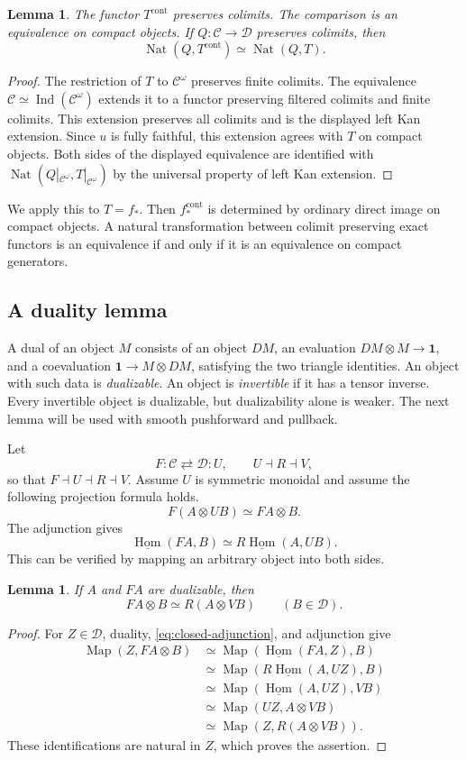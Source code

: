 \documentclass[11pt,reqno]{amsart}
\newtheorem{lemma}[theorem]{Lemma}
\theoremstyle{definition}
\theoremstyle{remark}
\theoremstyle{plain}
\numberwithin{equation}{section}
\newcommand{\one}{\mathbf 1}
\newcommand{\Hom}{\underline{\operatorname{Hom}}}
\DeclareMathOperator{\Map}{Map}
\DeclareMathOperator{\Nat}{Nat}
\DeclareMathOperator{\Ind}{Ind}
\newcommand{\cont}{\mathrm{cont}}
\newcommand{\C}{\mathcal C}
\newcommand{\D}{\mathcal D}
\begin{document}
\begin{lemma}\label{lem:continuous}
The functor \(T^{\cont}\) preserves colimits.
The comparison is an equivalence on compact objects.
If \(Q:\C\to\D\) preserves colimits, then
\[
 \Nat(Q,T^{\cont})\simeq\Nat(Q,T).
\]
\end{lemma}
\begin{proof}
The restriction of \(T\) to \(\C^\omega\) preserves finite colimits.
The equivalence \(\C\simeq\Ind(\C^\omega)\) extends it to a functor preserving filtered colimits and finite colimits.
This extension preserves all colimits and is the displayed left Kan extension.
Since \(u\) is fully faithful, this extension agrees with \(T\) on compact objects.
Both sides of the displayed equivalence are identified with
\(\Nat(Q|_{\C^\omega},T|_{\C^\omega})\) by the universal property of left Kan extension.
\end{proof}

We apply this to \(T=f_*\).
Then \(f_*^{\cont}\) is determined by ordinary direct image on compact objects.
A natural transformation between colimit preserving exact functors is an equivalence
if and only if it is an equivalence on compact generators.

\subsection{A duality lemma}
A dual of an object \(M\) consists of an object \(DM\), an evaluation
\(DM\otimes M\to\one\), and a coevaluation
\(\one\to M\otimes DM\), satisfying the two triangle identities.
An object with such data is \emph{dualizable}.
An object is \emph{invertible} if it has a tensor inverse.
Every invertible object is dualizable, but dualizability alone is weaker.
The next lemma will be used with smooth pushforward and pullback.

Let
\[
 F:\C\rightleftarrows\D:U,\qquad U\dashv R\dashv V,
\]
so that \(F\dashv U\dashv R\dashv V\).
Assume \(U\) is symmetric monoidal and assume the following projection formula holds.
\[
 F(A\otimes UB)\simeq FA\otimes B.
\]
The adjunction gives
\begin{equation}\label{eq:closed-adjunction}
 \Hom(FA,B)\simeq R\Hom(A,UB).
\end{equation}
This can be verified by mapping an arbitrary object into both sides.

\begin{lemma}\label{lem:abstract-duality}
If \(A\) and \(FA\) are dualizable, then
\[
 FA\otimes B\simeq R(A\otimes VB)
 \qquad(B\in\D).
\]
\end{lemma}
\begin{proof}
For \(Z\in\D\), duality, \eqref{eq:closed-adjunction}, and adjunction give
\begin{align*}
 \Map(Z,FA\otimes B)
 &\simeq\Map(\Hom(FA,Z),B)\\
 &\simeq\Map(R\Hom(A,UZ),B)\\
 &\simeq\Map(\Hom(A,UZ),VB)\\
 &\simeq\Map(UZ,A\otimes VB)\\
 &\simeq\Map(Z,R(A\otimes VB)).
\end{align*}
These identifications are natural in \(Z\), which proves the assertion.
\end{proof}
\end{document}
